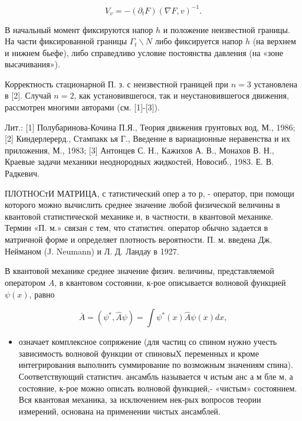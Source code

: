 \documentclass[10pt]{article}
\begin{document}
\[

V_{v}=-\left(\partial_{t} F\right)(\nabla F, v)^{-1} .

\]



В начальный момент фиксируются напор $h$ и положение неизвестной границы. На части фиксированной границы $\Gamma_{t} \backslash N$ либо фиксируется напор $h$ (на верхнем и нижнем бьефе), либо справедливо условие постоянства давления (на «зоне высачивания»).



Корректность стационарной П. з. с неизвестной границей при $n=3$ установлена в [2]. Случай $n=2$, как установившегося, так и неустановившегося движения, рассмотрен многими авторами (см. [1]-[3]).



Лит.: [1] Полубаринова-Кочина П.Я., Теория движения грунтовых вод, М., 1986; [2] Киндерлерерд., Стампакк ья Г., Введение в вариационные неравенства и их приложения, М., 1983; [3] Антонцев С. Н., Кажихов А. В., Монахов В. Н., Краевые задачи механики неоднородных жидкостей, Новосиб., 1983. Е. В. Радкевич.



ПЛОТНОСтИ МАТРИЦА, с татистический опер а то р, - оператор, при помощи которого можно вычислить среднее значение любой физической величины в квантовой статистической механике и, в частности, в квантовой механике. Термин «П. м.» связан с тем, что статистич. оператор обычно задается в матричной форме и определяет плотность вероятности. П. м. введена Дж. Нейманом (J. Neumann) и Л. Д. Ландау в 1927.



В квантовой механике среднее значение физич. величины, представляемой оператором $\hat{A}$, в квантовом состоянии, к-рое описывается волновой функцией $\psi(x)$, равно



\[

\bar{A}=\left(\psi^{*}, \hat{A} \psi\right)=\int \psi^{*}(x) \hat{A} \psi(x) d x,

\]



\begin{itemize}

  \item означает комплексное сопряжение (для частиц со спином нужно учесть зависимость волновой функции от спиновыX переменных и кроме интегрирования выполнить суммирование по возможным значениям спина). Соответствующий статистич. ансамбль называется ч истым анс а м бле м, а состояние, к-рое можно описать волновой функцией,- «чистым» состоянием. Вся квантовая механика, за исключением нек-рых вопросов теории измерений, основана на применении чистых ансамблей.

\end{itemize}
\end{document}
